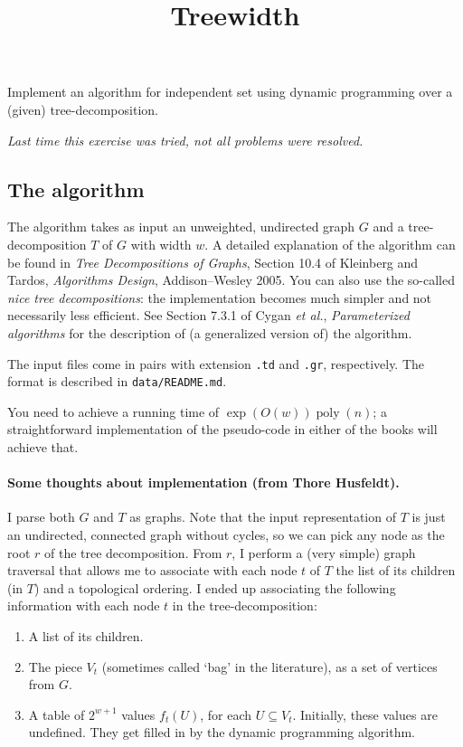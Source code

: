 \documentclass{tufte-handout}
\title{Treewidth}
\date{}
\author{}
\begin{document}
\maketitle

Implement an algorithm for independent set using dynamic programming over a (given) tree-decomposition.

\emph{Last time this exercise was tried, not all problems were resolved.}

\subsection{The algorithm}

The algorithm takes as input an unweighted, undirected graph $G$ and a tree-decomposition $T$ of $G$ with width $w$.
A detailed explanation of the algorithm can be found in \emph{Tree Decompositions of Graphs}, Section 10.4 of Kleinberg and Tardos, \emph{Algorithms Design}, Addison--Wesley 2005.
%
You can also use the so-called \emph{nice tree decompositions}: 
the implementation becomes much simpler and not necessarily 
less efficient. See Section 7.3.1 of Cygan \emph{et al.}, 
\emph{Parameterized algorithms} for the description of (a generalized version of) the 
algorithm.

The input files come in pairs with extension {\tt .td} and {\tt .gr}, respectively.
The format is described in {\tt data/README.md}.

You need to achieve a running time of $\exp(O(w))\operatorname{poly}(n)$; a straightforward 
implementation of the pseudo-code in either of the books will achieve that.


\paragraph{Some thoughts about implementation (from Thore Husfeldt).}
I parse both $G$ and $T$ as graphs.
Note that the input representation of $T$ is just an undirected, connected graph without cycles, so we can pick any node as the root $r$ of the tree decomposition.
From $r$, I perform a (very simple) graph traversal that allows me to associate with each node $t$ of $T$ the list of its children (in $T$) and a topological ordering.
I ended up associating the following information with each node $t$ in the tree-decomposition:
\begin{enumerate}
\item A list of its children.
\item The piece $V_t$ (sometimes called `bag' in the literature), as a set of vertices from $G$.
\item A table of $2^{w+1}$ values $f_t(U)$, for each $U\subseteq V_t$. 
  Initially, these values are undefined.
  They get filled in by the dynamic programming algorithm.
\end{enumerate}
\end{document}
